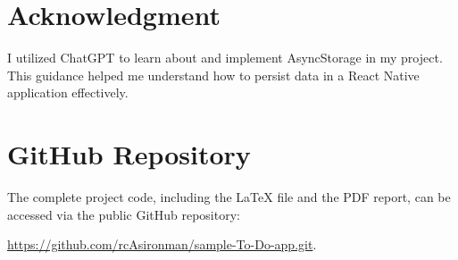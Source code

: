 \documentclass{article}
\begin{document}
\section*{Acknowledgment}
I utilized ChatGPT to learn about and implement AsyncStorage in my project. This guidance helped me understand how to persist data in a React Native application effectively.

\section*{GitHub Repository}
The complete project code, including the LaTeX file and the PDF report, can be accessed via the public GitHub repository:

\href{https://github.com/rcAsironman/sample-To-Do-app.git}{https://github.com/rcAsironman/sample-To-Do-app.git}.
\end{document}
